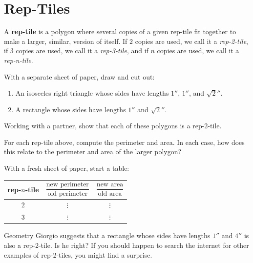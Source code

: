 \newpage
\section{Rep-Tiles}

A \textbf{rep-tile} is a polygon where several copies of
a given rep-tile fit together to make a larger, similar, version of
itself. If $2$ copies are used, we call it a \textit{rep-2-tile}, if
$3$ copies are used, we call it a \textit{rep-3-tile}, and if $n$ copies
are used, we call it a \textit{rep-n-tile}.


\begin{prob}
With a separate sheet of paper, draw and cut out:
\begin{enumerate}
\item An isosceles right triangle whose sides have lengths $1''$, $1''$, and $\sqrt{2}''$.
\item A rectangle whose sides have lengths $1''$ and $\sqrt{2}''$.
\end{enumerate}
Working with a partner, show that each of these polygons is a rep-2-tile.
\end{prob}

\begin{prob}
For each rep-tile above, compute the perimeter and area. In each case,
how does this relate to the perimeter and area of the larger polygon?
\end{prob}



\begin{prob}
With a fresh sheet of paper, start a table:
\begin{center}
\begin{tabular}{c|c|c}
rep-$n$-tile & $\dfrac{\text{new perimeter}}{\text{old perimeter}}$ & $\dfrac{\text{new area}}{\text{old area}}$  \\
\hline\hline
 2 & $\vdots$  &  $\vdots$  \\ 
3 & $\vdots$  &  $\vdots$  \\ 
\end{tabular}
\end{center}
\end{prob}


\begin{prob}
Geometry Giorgio suggests that a rectangle whose sides have lengths
$1''$ and $4''$ is also a rep-2-tile. Is he right? If you should
happen to search the internet for other examples of rep-2-tiles, you
might find a surprise.
\end{prob}


